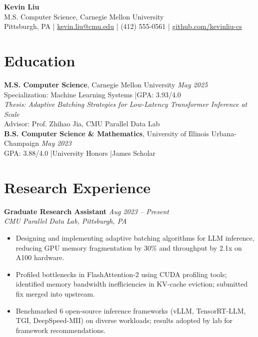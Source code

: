 \documentclass[11pt,a4paper]{article}
\begin{document}
\begin{center}
  {\LARGE \textbf{Kevin Liu}}\\[3pt]
  M.S. Computer Science, Carnegie Mellon University\\[4pt]
  Pittsburgh, PA \quad|\quad
  \href{mailto:kevin.liu@cmu.edu}{kevin.liu@cmu.edu} \quad|\quad
  (412) 555-0561 \quad|\quad
  \href{https://github.com/kevinliu-cs}{github.com/kevinliu-cs}
\end{center}

\section{Education}
\noindent\textbf{M.S. Computer Science}, Carnegie Mellon University \hfill \textit{May 2025}\\
Specialization: Machine Learning Systems \quad|\quad GPA: 3.93/4.0\\
\textit{Thesis:} \textit{Adaptive Batching Strategies for Low-Latency Transformer Inference at Scale}\\
Advisor: Prof. Zhihao Jia, CMU Parallel Data Lab\\[4pt]
\noindent\textbf{B.S. Computer Science \& Mathematics}, University of Illinois Urbana-Champaign \hfill \textit{May 2023}\\
GPA: 3.88/4.0 \quad|\quad University Honors \quad|\quad James Scholar

\section{Research Experience}

\noindent\textbf{Graduate Research Assistant} \hfill \textit{Aug 2023 -- Present}\\
\textit{CMU Parallel Data Lab, Pittsburgh, PA}
\begin{itemize}
  \item Designing and implementing adaptive batching algorithms for LLM inference, reducing GPU memory fragmentation by 30\% and throughput by 2.1x on A100 hardware.
  \item Profiled bottlenecks in FlashAttention-2 using CUDA profiling tools; identified memory bandwidth inefficiencies in KV-cache eviction; submitted fix merged into upstream.
  \item Benchmarked 6 open-source inference frameworks (vLLM, TensorRT-LLM, TGI, DeepSpeed-MII) on diverse workloads; results adopted by lab for framework recommendations.
\end{itemize}
\end{document}
